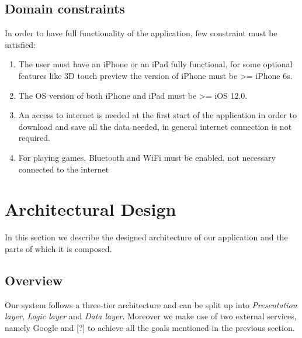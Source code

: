 \documentclass[paper=a4, fontsize=12pt]{scrartcl}
\numberwithin{equation}{section}		%
\numberwithin{figure}{section}			%
\numberwithin{table}{section}				%
\begin{document}
\subsection{Domain constraints}
In order to have full functionality of the application, few constraint must be satisfied:
\begin{enumerate}
\item The user must have an iPhone or an iPad fully functional, for some optional features like 3D touch preview the version of iPhone must be >= iPhone 6s.
\item The OS version of both iPhone and iPad must be >= iOS 12.0.
\item An access to internet is needed at the first start of the application in order to download and save all the data needed, in general internet connection is not required.
\item For playing games, Bluetooth and WiFi must be enabled, not necessary connected to the internet
\end{enumerate}
\newpage

\section{Architectural Design}

In this section we describe the designed architecture of our application and the parts of which it is composed.

\subsection{Overview}\label{section:overview}

Our system follows a three-tier architecture and can be split up into \textit{Presentation layer}, \textit{Logic layer} and \textit{Data layer}.
Moreover we make use of two external services, namely Google and [?] to achieve all the goals mentioned in the previous section.
\end{document}
